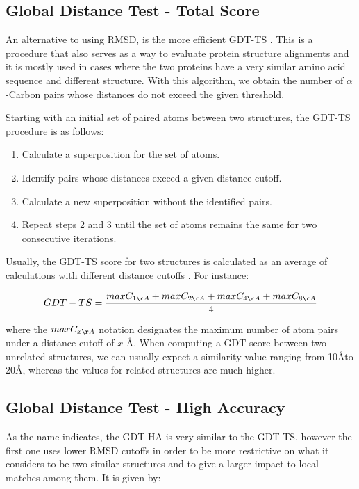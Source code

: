 \medskip
\subsection{Global Distance Test - Total Score}

An alternative to using RMSD, is the more efficient \gls{GDT-TS} \cite{zemla2003lga}. This is a procedure that also serves as a way to evaluate protein structure alignments and it is mostly used in cases where the two proteins have a very similar amino acid sequence and different structure. With this algorithm, we obtain the number of $\alpha$-Carbon pairs whose distances do not exceed the given threshold. 

Starting with an initial set of paired atoms between two structures, the GDT-TS procedure is as follows:
\begin{enumerate}
	\item Calculate a superposition for the set of atoms.
	\item Identify pairs whose distances exceed a given distance cutoff.
	\item Calculate a new superposition without the identified pairs.
	\item Repeat steps 2 and 3 until the set of atoms remains the same for two consecutive iterations.
\end{enumerate}

Usually, the GDT-TS score for two structures is calculated as an average of calculations with different distance cutoffs \cite{poleksic2009algorithms}. For instance:

$$ GDT-TS = \frac{ max C_{1\AA} + max C_{2\AA} + max C_{4\AA} + max C_{8\AA} } {4} $$
	
where the $max C_{x\AA}$ notation designates the maximum number of atom pairs under a distance cutoff of $x$ \AA. When computing a GDT score between two unrelated structures, we can usually expect a similarity value ranging from 10\AA to 20\AA, whereas the values for related structures are much higher. \cite{herbert2008maxcluster}

\medskip
\subsection{Global Distance Test - High Accuracy}

As the name indicates, the \gls{GDT-HA} is very similar to the GDT-TS, however the first one uses lower RMSD cutoffs in order to be more restrictive on what it considers to be two similar structures and to give a larger impact to local matches among them. It is given by:

